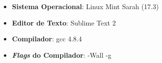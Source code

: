 \begin{itemize}
	\item{\textbf{Sistema Operacional}: Linux Mint Sarah (17.3)}
	\item{\textbf{Editor de Texto}: Sublime Text 2}
	\item{\textbf{Compilador}: gcc 4.8.4}
	\item{\textbf{\emph{Flags} do Compilador}: -Wall -g}
\end{itemize}
